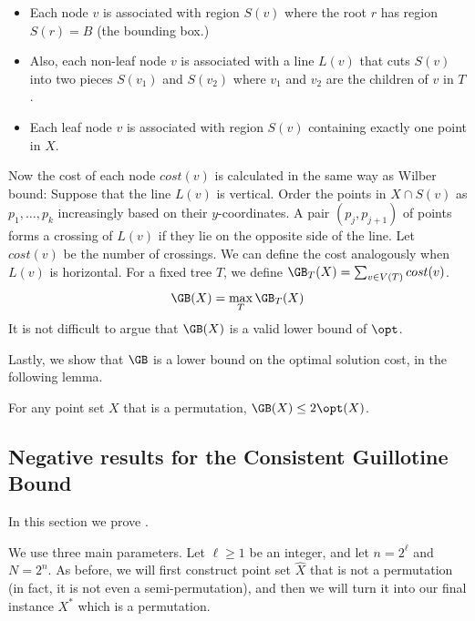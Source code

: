 \begin{itemize}
\item Each node $v$ is associated with region $S(v)$ where the root $r$ has region $S(r) = B$ (the bounding box.) 

\item Also, each non-leaf node $v$ is associated with a line $L(v)$ that cuts $S(v)$ into two pieces $S(v_1)$ and $S(v_2)$ where $v_1$ and $v_2$ are the children of $v$ in $T$.

\item Each leaf node $v$ is associated with region $S(v)$ containing exactly one point in $X$.  
\end{itemize}  

Now the cost of each node $cost(v)$ is calculated in the same way as Wilber bound: Suppose that the line $L(v)$ is vertical. Order the points in $X \cap S(v)$ as $p_1, \ldots, p_k$ increasingly based on their $y$-coordinates. A pair $(p_j, p_{j+1})$ of points forms a crossing of $L(v)$ if they lie on the opposite side of the line.
Let $cost(v)$ be the number of crossings. 
We can define the cost analogously when $L(v)$ is horizontal. 
For a fixed tree $T$, we define $\GB_{T}(X) = \sum_{v \in V(T)} cost(v)$. 
\[ \GB(X) = \max_{T} \GB_{T}(X) \]  
It is not difficult to argue that $\GB(X)$ is a valid lower bound of $\opt$. 
\fi

Lastly, we show that $\GB$ is a lower bound on the optimal solution cost, in the following lemma. 

\begin{lemma}\label{lem: GB is lb for opt}
For any point set $X$ that is a permutation, $\GB(X) \leq 2 \opt(X)$.  
\end{lemma} 


%
%
%


%
%



%
%
%
%
\subsection{Negative results for the Consistent Guillotine Bound}\label{subsec: Instance construction for extended}
%
%
%
%
In this section we prove .

\newcommand{\EESBRS}{\mbox{\sf 2D-ES-BRS}}
We use three main parameters. Let $\ell\geq 1$ be an integer, and let $n = 2^{\ell}$ and $N= 2^n$.
As before, we will first construct point set $\hat{X}$ that is not a permutation (in fact, it is not even a semi-permutation), and then we will turn it into our final instance $X^*$ which is a permutation.  
%

